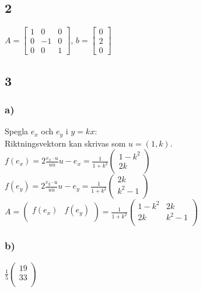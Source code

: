 \documentclass{article}
\begin{document}
\subsection*{2}
$A = 
\begin{bmatrix}
1  &  0 & 0 \\
0  & -1 & 0 \\
0  &  0 & 1
\end{bmatrix}$, 
$ b = 
\begin{bmatrix}
0 \\
2 \\
0
\end{bmatrix}$

\subsection*{3}
\subsubsection*{a)}
Spegla $e_x$ och $e_y$ i $y = kx$: \\
Riktningsvektorn kan skrivas som $u = (1,k)$. \\
$f(e_x) = 
2 \frac{e_x \cdot u}{u \dot u} u - e_x = 
\frac{1}{1+k^2}
\begin{pmatrix}
 1 - k^2   \\
 2k       \\
\end{pmatrix}$ \\
$f(e_y) = 
2 \frac{e_y \cdot u}{u \dot u} u - e_y = 
\frac{1}{1+k^2}
\begin{pmatrix}
 2k   \\
 k^2 - 1      \\
\end{pmatrix}$ \\
$A = 
\begin{pmatrix}
 f(e_x) & f(e_y) \\
\end{pmatrix}
=
\frac{1}{1+k^2}
\begin{pmatrix}
 1 - k^2 & 2k   \\
 2k & k^2 - 1      \\
\end{pmatrix}
$
\subsubsection*{b)}
$
\frac{1}{5}
\begin{pmatrix}
 19   \\
 33     \\
\end{pmatrix}
$
\end{document}

